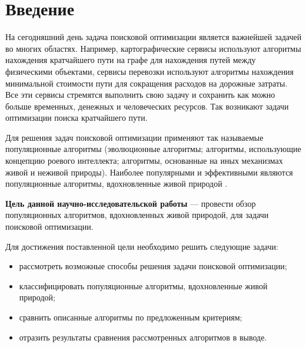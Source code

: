 \chapter*{Введение}

На сегодняшний день задача поисковой оптимизации является важнейшей задачей во многих областях. Например, картографические сервисы используют алгоритмы нахождения кратчайшего пути на графе  для нахождения путей между физическими объектами, сервисы перевозки используют алгоритмы нахождения минимальной стоимости пути для сокращения расходов на дорожные затраты. Все эти сервисы стремятся выполнить свою задачу и сохранить как можно больше временных, денежных и человеческих ресурсов. Так возникают задачи оптимизации поиска кратчайшего пути.

Для  решения  задач поисковой оптимизации применяют так называемые популяционные алгоритмы (эволюционные алгоритмы; алгоритмы, использующие  концепцию  роевого  интеллекта;  алгоритмы,  основанные  на иных механизмах живой  и неживой  природы). Наиболее популярными и эффективными являются популяционные алгоритмы, вдохновленные живой природой \cite{karpenko} \cite{eremeev}.

\textbf{Цель данной научно-исследовательской работы} --- провести обзор популяционных алгоритмов, вдохновленных живой природой, для задачи поисковой оптимизации.

Для достижения поставленной цели необходимо решить следующие задачи:
\begin{itemize}
	\item рассмотреть возможные способы решения задачи поисковой оптимизации;
	\item классифицировать популяционные алгоритмы, вдохновленные живой природой;
	\item сравнить описанные алгоритмы по предложенным критериям;
	\item отразить результаты сравнения рассмотренных алгоритмов в выводе.
\end{itemize}


